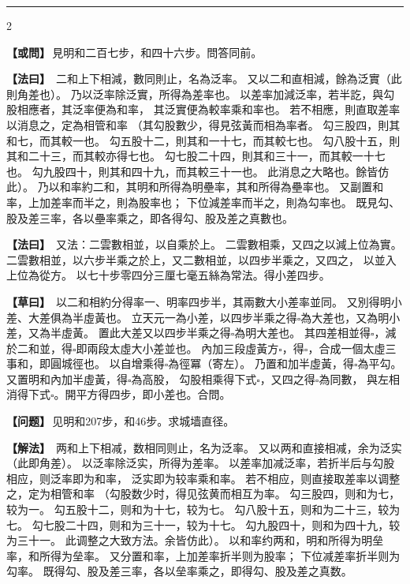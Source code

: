 \documentclass[11pt,a4paper]{article}
\let\origsquare\square
\renewcommand{\square}{\ensuremath{\origsquare}}%
\newcommand{\longline}{\noindent\rule{\textwidth}{0.4pt}}
\newcommand{\clOWEN}[1]{%
  \par\vspace{0.3em}%
  \noindent\textcolor{problemcolor}{\textbf{【或問】}}\,{\tradfont #1}\par\nopagebreak%
}
\newcommand{\mdOWEN}[1]{%
  \par\vspace{0.3em}%
  \noindent\textcolor{problemcolor}{\textbf{【问题】}}\,{\modfont #1}\par\nopagebreak%
}
\newcommand{\clFAYUE}[1]{%
  \par\noindent\textcolor{methodcolor}{\textbf{【法曰】}}\,{\tradfont #1}\par\nopagebreak%
}
\newcommand{\mdFAYUE}[1]{%
  \par\noindent\textcolor{methodcolor}{\textbf{【解法】}}\,{\modfont #1}\par\nopagebreak%
}
\newcommand{\clTSAOYUE}[1]{%
  \par\noindent\textcolor{workcolor}{\textbf{【草曰】}}\,{\tradfont #1}\par%
}
\begin{document}
\vspace{0.3cm}
\begin{center}\longline\end{center}

\begin{paracol}{2}

\begin{leftcolumn}
\clOWEN{見明和二百七步，和四十六步。問答同前。}

\clFAYUE{%
二和上下相減，數同則止，名為泛率。
又以二和直相減，餘為泛實（此則角差也）。
乃以泛率除泛實，所得為差率也。
以差率加減泛率，若半訖，與勾股相應者，其泛率便為和率，
其泛實便為較率乘和率也。
若不相應，則直取差率以消息之，定為相管和率
（其勾股數少，得見弦黃而相為率者。
勾三股四，則其和七，而其較一也。
勾五股十二，則其和一十七，而其較七也。
勾八股十五，則其和二十三，而其較亦得七也。
勾七股二十四，則其和三十一，而其較一十七也。
勾九股四十，則其和四十九，而其較三十一也。
此消息之大略也。餘皆仿此）。
乃以和率約二和，其明和所得為明壘率，其和所得為壘率也。
又副置和率，上加差率而半之，則為股率也；
下位減差率而半之，則為勾率也。
既見勾、股及差三率，各以壘率乘之，即各得勾、股及差之真數也。}

\clFAYUE{%
又法：二雲數相並，以自乘於上。
二雲數相乘，又四之以減上位為實。
二雲數相並，以六步半乘之於上，又二數相並，以四步半乘之，又四之，
以並入上位為從方。
以七十步零四分三厘七毫五絲為常法。得小差四步。}

\clTSAOYUE{%
以二和相約分得率一、明率四步半，其兩數大小差率並同。
又別得明小差、大差俱為半虛黃也。
立天元一為小差，以四步半乘之得$\square$為大差也，又為明小差，又為半虛黃。
置此大差又以四步半乘之得$\square$為明大差也。
其四差相並得$\square$，減於二和並，得$\square$即兩段太虛大小差並也。
內加三段虛黃方$\square$，得$\square$，合成一個太虛三事和，即圓城徑也。
以自增乘得$\square$為徑冪（寄左）。
乃置和加半虛黃，得$\square$為平勾。
又置明和內加半虛黃，得$\square$為高股，
勾股相乘得下式$\square$，又四之得$\square$為同數，
與左相消得下式$\square$。開平方得四步，即小差也。合問。}
\end{leftcolumn}

\switchcolumn

\begin{rightcolumn}
\mdOWEN{见明和207步，和46步。求城墙直径。}

\mdFAYUE{%
两和上下相减，数相同则止，名为泛率。
又以两和直接相减，余为泛实（此即角差）。
以泛率除泛实，所得为差率。
以差率加减泛率，若折半后与勾股相应，则泛率即为和率，
泛实即为较率乘和率。
若不相应，则直接取差率以调整之，定为相管和率
（勾股数少时，得见弦黄而相互为率。
勾三股四，则和为七，较为一。
勾五股十二，则和为十七，较为七。
勾八股十五，则和为二十三，较为七。
勾七股二十四，则和为三十一，较为十七。
勾九股四十，则和为四十九，较为三十一。
此调整之大致方法。余皆仿此）。
以和率约两和，明和所得为明垒率，和所得为垒率。
又分置和率，上加差率折半则为股率；
下位减差率折半则为勾率。
既得勾、股及差三率，各以垒率乘之，即得勾、股及差之真数。}


\end{rightcolumn}
\end{paracol}
\end{document}

